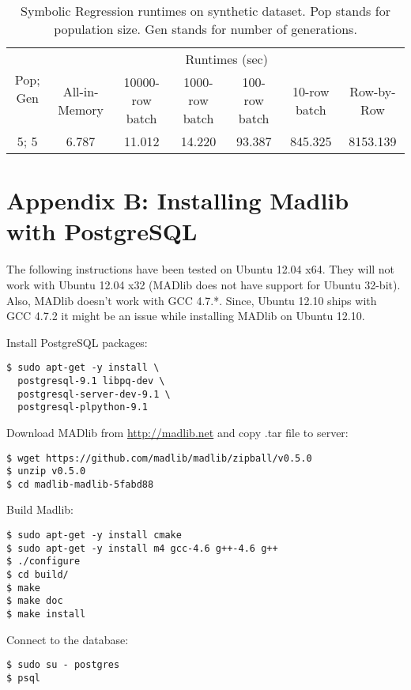 \begin{table}[!htbp]
\small
\centering
\begin{tabular}{|c|c|c|c|c|c|c|}
\hline
\multirow{2}{*}{Pop; Gen} & \multicolumn{6}{|c|}{Runtimes (sec)}\\
\cline{2-7}
& All-in-Memory & 10000-row batch & 1000-row batch & 100-row batch & 10-row batch & Row-by-Row \\
\hline
5; 5 & 6.787 & 11.012 & 14.220 &  93.387 & 845.325 &8153.139 \\
\hline
\end{tabular}
\caption{Symbolic Regression runtimes on synthetic dataset. Pop stands for population size. Gen stands for number of generations.}
\label{tab:GPbatchRunTimes}
\end{table}



\section*{Appendix B: Installing Madlib with PostgreSQL}
The following instructions have been tested on Ubuntu 12.04 x64. They will not work with Ubuntu 12.04 x32 (MADlib does not have support for Ubuntu 32-bit). Also, MADlib doesn't work with GCC 4.7.*. Since,  Ubuntu 12.10 ships with GCC 4.7.2 it might be an issue while installing MADlib on Ubuntu 12.10.

\vspace{\baselineskip}
{\raggedleft Install PostgreSQL packages:}
\begin{verbatim}
$ sudo apt-get -y install \
  postgresql-9.1 libpq-dev \
  postgresql-server-dev-9.1 \
  postgresql-plpython-9.1
\end{verbatim}

{\raggedleft Download MADlib from \url{http://madlib.net} and copy .tar file to server:}
\begin{verbatim}
$ wget https://github.com/madlib/madlib/zipball/v0.5.0
$ unzip v0.5.0
$ cd madlib-madlib-5fabd88
\end{verbatim}

{\raggedleft Build Madlib:}
\begin{verbatim}
$ sudo apt-get -y install cmake
$ sudo apt-get -y install m4 gcc-4.6 g++-4.6 g++
$ ./configure
$ cd build/
$ make
$ make doc
$ make install
\end{verbatim}

{\raggedleft Connect to the database:}
\begin{verbatim}
$ sudo su - postgres
$ psql
\end{verbatim}

